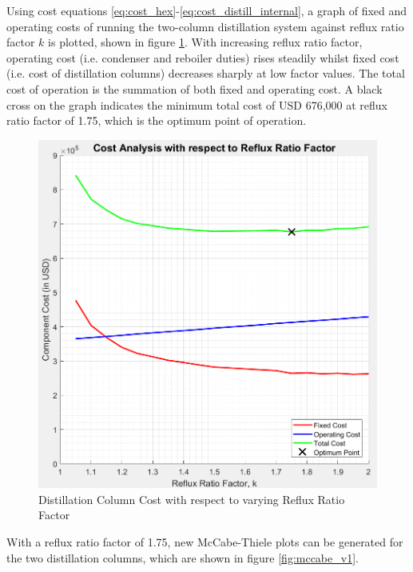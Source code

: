     \noindent Using cost equations \ref{eq:cost_hex}-\ref{eq:cost_distill_internal}, a graph of fixed and operating costs of running the two-column distillation system against reflux ratio factor $k$ is plotted, shown in figure \ref{fig:column_cost_vs_reflux}.
    With increasing reflux ratio factor, operating cost (i.e. condenser and reboiler duties) rises steadily whilst fixed cost (i.e. cost of distillation columns) decreases sharply at low factor values. The total cost of operation is the summation of both fixed and operating cost. A black cross on the graph indicates the minimum total cost of USD 676,000 at reflux ratio factor of 1.75, which is the optimum point of operation. \\
    \begin{figure}[H]
        \centering
        \includegraphics[scale=0.45]{column_cost_vs_reflux.jpeg}
        \caption{Distillation Column Cost with respect to varying Reflux Ratio Factor}
        \label{fig:column_cost_vs_reflux}
    \end{figure}
    \noindent With a reflux ratio factor of 1.75, new McCabe-Thiele plots can be generated for the two distillation columns, which are shown in figure \ref{fig:mccabe_v1}.

